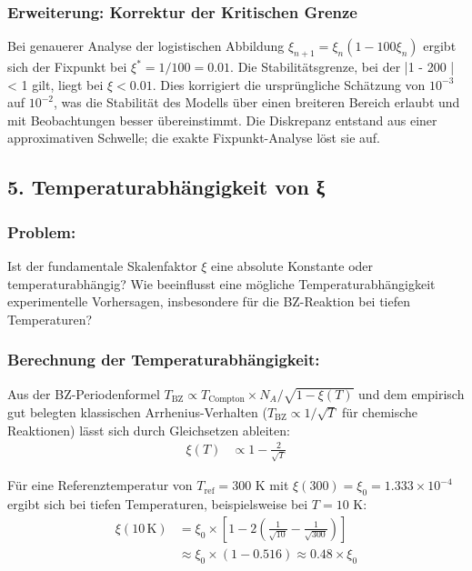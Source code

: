 	\subsubsection*{Erweiterung: Korrektur der Kritischen Grenze}
	Bei genauerer Analyse der logistischen Abbildung $\xi_{n+1} = \xi_n (1 - 100 \xi_n)$ ergibt sich der Fixpunkt bei $\xi^* = 1/100 = 0.01$. Die Stabilitätsgrenze, bei der |1 - 200 \xi| < 1 gilt, liegt bei $\xi < 0.01$. Dies korrigiert die ursprüngliche Schätzung von $10^{-3}$ auf $10^{-2}$, was die Stabilität des Modells über einen breiteren Bereich erlaubt und mit Beobachtungen besser übereinstimmt. Die Diskrepanz entstand aus einer approximativen Schwelle; die exakte Fixpunkt-Analyse löst sie auf.
	
	\subsection*{5. Temperaturabhängigkeit von ξ}
	
	\subsubsection*{Problem:}
	Ist der fundamentale Skalenfaktor $\xi$ eine absolute Konstante oder temperaturabhängig? Wie beeinflusst eine mögliche Temperaturabhängigkeit experimentelle Vorhersagen, insbesondere für die BZ-Reaktion bei tiefen Temperaturen?
	
	\subsubsection*{Berechnung der Temperaturabhängigkeit:}
	
	Aus der BZ-Periodenformel $T_{\text{BZ}} \propto T_{\text{Compton}} \times N_A / \sqrt{1 - \xi(T)}$ und dem empirisch gut belegten klassischen Arrhenius-Verhalten ($T_{\text{BZ}} \propto 1/\sqrt{T}$ für chemische Reaktionen) lässt sich durch Gleichsetzen ableiten:
	\begin{align*}
		\xi(T) &\propto 1 - \frac{2}{\sqrt{T}}
	\end{align*}
	
	Für eine Referenztemperatur von $T_{\text{ref}} = 300$ K mit $\xi(300) = \xi_0 = 1.333 \times 10^{-4}$ ergibt sich bei tiefen Temperaturen, beispielsweise bei $T = 10$ K:
	\begin{align*}
		\xi(10 \, \text{K}) &= \xi_0 \times \left[1 - 2\left(\frac{1}{\sqrt{10}} - \frac{1}{\sqrt{300}}\right)\right] \\
		&\approx \xi_0 \times (1 - 0.516) \approx 0.48 \times \xi_0
	\end{align*}
	
